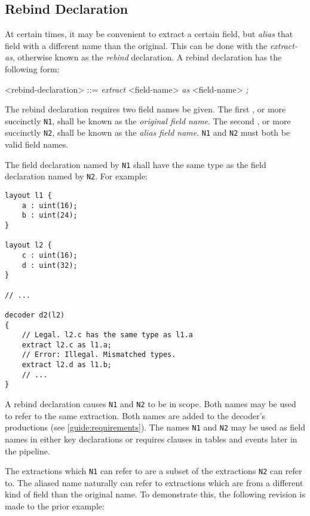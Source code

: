 \subsection{Rebind Declaration} \label{guide:rebind}

At certain times, it may be convenient to extract a certain field, but \textit{alias} that field with a different name than the original. This can be done with the \textit{extract-as}, otherwise known as the \textit{rebind} declaration. A rebind declaration has the following form:

\begin{minip}
\begin{grammar}
<rebind-declaration> ::=
\textit{extract} <field-name> \textit{as} <field-name> \textit{;}
\end{grammar}
\end{minip}

The rebind declaration requires two field names be given. The first , or more succinctly \texttt{N1}, shall be known as the \textit{original field name}. The second , or more succinctly \texttt{N2}, shall be known as the \textit{alias field name}. \texttt{N1} and \texttt{N2} must both be valid field names.

The field declaration named by \texttt{N1} shall have the same type as the field declaration named by \texttt{N2}. For example:

\begin{minip}
\begin{lstlisting}
layout l1 {
	a : uint(16);
	b : uint(24);
}

layout l2 {
	c : uint(16);
	d : uint(32);
}

// ...

decoder d2(l2)
{
	// Legal. l2.c has the same type as l1.a
	extract l2.c as l1.a;
	// Error: Illegal. Mismatched types.
	extract l2.d as l1.b;
	// ...
} 
\end{lstlisting}
\end{minip}

A rebind declaration causes \texttt{N1} and \texttt{N2} to be in scope. Both names may be used to refer to the same extraction. Both names are added to the decoder's productions (see \ref{guide:requirements}). The names \texttt{N1} and \texttt{N2} may be used as field names in either key declarations or requires clauses in tables and events later in the pipeline. 

The extractions which \texttt{N1} can refer to are a subset of the extractions \texttt{N2} can refer to. The aliased name naturally can refer to extractions which are from a different kind of field than the original name. To demonstrate this, the following revision is made to the prior example:

